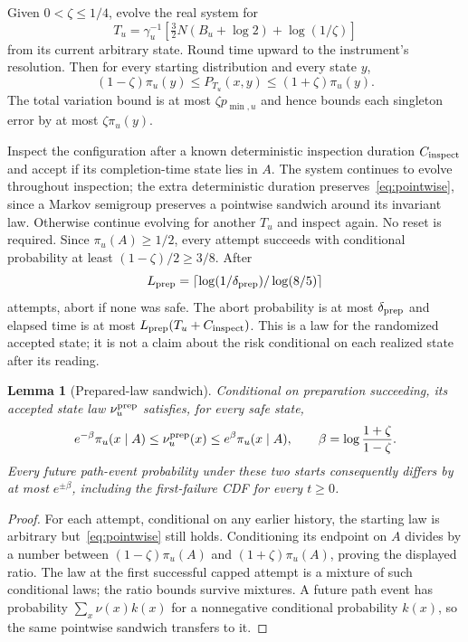 \documentclass[11pt]{article}
\newtheorem{lemma}[theorem]{Lemma}
\begin{document}
Given $0<\zeta\le1/4$, evolve the real system for
\begin{equation}
 T_u=\gamma_u^{-1}\left[\tfrac32N(B_u+\log2)+\log(1/\zeta)\right]
 \label{eq:prep-time}
\end{equation}
from its current arbitrary state. Round time upward to the instrument's resolution. Then for every starting distribution and every state $y$,
\begin{equation}
 (1-\zeta)\pi_u(y)\le P_{T_u}(x,y)\le(1+\zeta)\pi_u(y).
 \label{eq:pointwise}
\end{equation}
The total variation bound is at most $\zeta p_{\min,u}$ and hence bounds each singleton error by at most $\zeta\pi_u(y)$.

Inspect the configuration after a known deterministic inspection duration $C_{\rm inspect}$ and accept if its completion-time state lies in $A$. The system continues to evolve throughout inspection; the extra deterministic duration preserves~\eqref{eq:pointwise}, since a Markov semigroup preserves a pointwise sandwich around its invariant law. Otherwise continue evolving for another $T_u$ and inspect again. No reset is required. Since $\pi_u(A)\ge1/2$, every attempt succeeds with conditional probability at least $(1-\zeta)/2\ge3/8$. After
\[
 L_{\rm prep}=\left\lceil\log(1/\delta_{\rm prep})/\log(8/5)\right\rceil
\]
attempts, abort if none was safe. The abort probability is at most $\delta_{\rm prep}$ and elapsed time is at most $L_{\rm prep}(T_u+C_{\rm inspect})$. This is a law for the randomized accepted state; it is not a claim about the risk conditional on each realized state after its reading.

\begin{lemma}[Prepared-law sandwich]
Conditional on preparation succeeding, its accepted state law $\nu_u^{\rm prep}$ satisfies, for every safe state,
\begin{equation}
 e^{-\beta}\pi_u(x\mid A)\le\nu_u^{\rm prep}(x)\le e^\beta\pi_u(x\mid A),
 \qquad \beta=\log\frac{1+\zeta}{1-\zeta}.
 \label{eq:start-sandwich}
\end{equation}
Every future path-event probability under these two starts consequently differs by at most $e^{\pm\beta}$, including the first-failure CDF for every $t\ge0$.
\end{lemma}
\begin{proof}
For each attempt, conditional on any earlier history, the starting law is arbitrary but~\eqref{eq:pointwise} still holds. Conditioning its endpoint on $A$ divides by a number between $(1-\zeta)\pi_u(A)$ and $(1+\zeta)\pi_u(A)$, proving the displayed ratio. The law at the first successful capped attempt is a mixture of such conditional laws; the ratio bounds survive mixtures. A future path event has probability $\sum_x\nu(x)k(x)$ for a nonnegative conditional probability $k(x)$, so the same pointwise sandwich transfers to it.
\end{proof}
\end{document}
